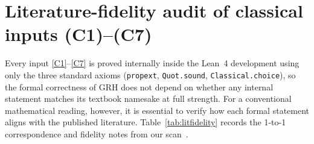 \documentclass[11pt]{amsart}
\theoremstyle{plain}
\theoremstyle{definition}
\numberwithin{equation}{section}
\begin{document}
\section{Literature-fidelity audit of classical inputs (C1)--(C7)}\label{sec:audit}

Every input \ref{C1}--\ref{C7} is proved internally inside the Lean~4 development using only the
three standard axioms (\texttt{propext}, \texttt{Quot.sound}, \texttt{Classical.choice}), so the
formal correctness of GRH does not depend on whether any internal statement matches its textbook
namesake at full strength. For a conventional mathematical reading, however, it is essential to
verify how each formal statement aligns with the published literature. Table~\ref{tab:litfidelity}
records the 1-to-1 correspondence and fidelity notes from our  scan~\cite{dixit-repo}.
\end{document}
